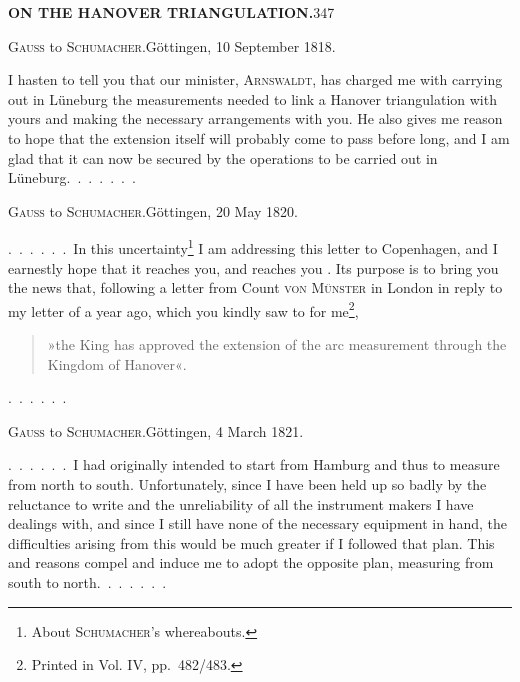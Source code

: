 \noindent\textbf{ON THE HANOVER TRIANGULATION.}\hfill347
\begin{center}\textsc{Gauss} to \textsc{Schumacher}.\quad Göttingen, 10 September 1818.\end{center}

I hasten to tell you that our minister, \textsc{Arnswaldt}, has charged me
with carrying out in Lüneburg the measurements needed to link a Hanover
triangulation with yours and making the necessary
arrangements with you. He also gives me reason to hope that
the extension itself will probably come to pass before long, and
I am glad that it can now be secured by the operations to be carried out
in Lüneburg.\ .\ .\ .\ .\ .\ .

\begin{center}\textsc{Gauss} to \textsc{Schumacher}.\quad Göttingen, 20 May 1820.\end{center}
\begingroup
\makeatletter
\renewcommand{\@makefnmark}{\hbox{\normalfont[\textsuperscript{*})]}}
\long{}
\makeatother
\par\noindent\hspace*{\parindent}.\ .\ .\ .\ .\ .\ In this uncertainty\footnote{About \textsc{Schumacher}'s whereabouts.} I am addressing this letter to Copenhagen,
and I earnestly hope that it reaches you, and reaches you . Its
purpose is to bring you the news that, following a letter
from Count \textsc{von Münster} in London in reply to my letter of a year ago,
\makeatletter
\renewcommand{\@makefnmark}{\hbox{\normalfont[\textsuperscript{**})]}}
\long\def\@makefntext#1{\parindent1.5em\noindent[\textsuperscript{**})\ #1]}
\makeatother
which you kindly saw to for me\footnote{Printed in Vol. IV, pp.~482/483.},
\begin{quote}
»the King has approved the extension of the arc measurement through the Kingdom
of Hanover«.
\end{quote}
\par\medskip
.\ .\ .\ .\ .\ .
\endgroup

\begin{center}\textsc{Gauss} to \textsc{Schumacher}.\quad Göttingen, 4 March 1821.\end{center}

.\ .\ .\ .\ .\ .\ I had originally intended to start from Hamburg and thus
to measure from north to south. Unfortunately, since I have been held up so badly by the
reluctance to write and the unreliability of all the instrument makers I have dealings
with, and since I still have none of the necessary
equipment in hand, the difficulties arising from this
would be much greater if I followed that plan. This and
 reasons compel and induce me
to adopt the opposite plan, measuring from south to north.\ .\ .\ .\ .\ .\ .
\par
\makeatletter
\insert{}
\makeatother

